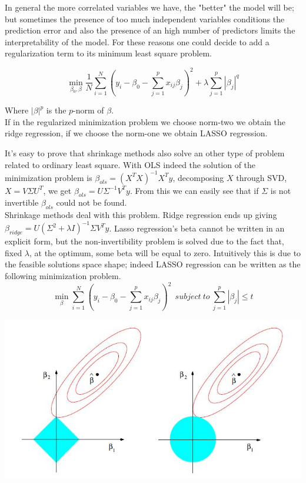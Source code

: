\documentclass{article}%
\begin{document}
In general the more correlated variables we have, the "better" the model will be; but sometimes the presence of too much independent variables conditions the prediction error and also the presence of an high number of predictors limits the interpretability of the model. For these reasons one could decide to add a regularization term to its minimum least square problem.

\[
\min_{\beta_0 , \beta} \frac{1}{N} \sum_{i=1}^N (y_i-\beta_0 - \sum_{j=1}^p x_{ij}\beta_j)^2 + \lambda\sum_{j=1}^p |\beta_j |^q 
\]

Where $|\beta|^p$ is the $p$-norm of $\beta$.
\\

If in the regularized minimization problem we choose norm-two we obtain the ridge regression, if we choose the norm-one we obtain LASSO regression. 


It's easy to prove that shrinkage methods also solve an other type of problem related to ordinary least square. With OLS indeed the solution of the minimization problem is $ \beta_{ols}=(X^TX)^{-1}X^Ty$, decomposing $X$ through SVD, $X=V\Sigma U^T$, we get $\beta_{ols}=U\Sigma^{-1}V^Ty$. From this we can easily see that if $\Sigma$ is not invertible $\beta_{ols}$ could not be found.
\\

Shrinkage methods deal with this problem. Ridge regression ends up giving $\beta_{ridge}=U(\Sigma^2+\lambda I)^{-1} \Sigma V^T y$. Lasso regression's beta cannot be written in an explicit form, but the non-invertibility problem is solved due to the fact that, fixed $\lambda$, at the optimum, some beta will be equal to zero. Intuitively this is due to the feasible solutions space shape; indeed LASSO regression can be written as the following minimization problem.
\begin{equation}
 \min_{\beta} \sum_{i=1}^N ( y_i -\beta_0 -\sum_{j=1}^p x_{ij} \beta_j)^2 ~~subject~to~\sum_{j=1}^p |\beta_j| \leq t
\end{equation}

\includegraphics[scale=0.75]{lasso}
\end{document}
